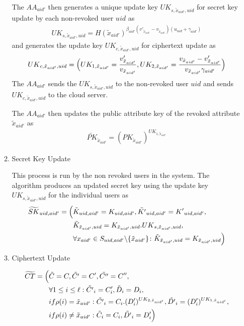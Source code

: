 \begin{enumerate}
\begin{enumerate}
		The $AA_{aid'}$ then generates a unique update key ${UK}_{s,\tilde{x}_{aid'},uid}$ for secret key update by each non-revoked user $uid$ as
		\begin{align*}
			{UK}_{s,\tilde{x}_{aid'},uid} = H(\tilde{x}_{aid'})^{\beta_{aid'}(v'_{\tilde{x}_{aid'}}-v_{\tilde{x}_{aid'}})(u_{uid}+\gamma_{aid'})}
		\end{align*}
		and generates the update key ${UK}_{c,\tilde{x}_{aid'},uid}$ for ciphertext update as
		\begin{align*}
			{UK}_{c,\tilde{x}_{aid'},uid} =\Bigl( UK_{1,\tilde{x}_{aid'}} = \frac{v'_{\tilde{x}_{aid'}}}{v_{\tilde{x}_{aid'}}}, UK_{2,\tilde{x}_{aid'}} = \frac{v_{\tilde{x}_{aid'}} - v'_{\tilde{x}_{aid'}}}{v_{\tilde{x}_{aid'}}\gamma_{aid'}} \Bigl)
		\end{align*}
		The $AA_{aid'}$ sends the ${UK}_{s,\tilde{x}_{aid'},uid}$ to the non-revoked user $uid$ and sends ${UK}_{c,\tilde{x}_{aid'},uid}$ to the cloud server.
		
		The $AA_{aid'}$ then updates the public attribute key of the revoked attribute $\tilde{x}_{aid'}$ as
		\begin{align*}
			\widetilde{PK}_{\tilde{x}_{aid'}} = ({PK}_{\tilde{x}_{aid'}})^{UK_{1,\tilde{x}_{aid'}}}
		\end{align*}
		
		
		\item Secret Key Update
		
		This process is run by the non revoked users in the system. The algorithm produces an updated secret key using the update key ${UK}_{s,\tilde{x}_{aid'},uid}$ for the individual users as
		\begin{align*}
			\widetilde{SK}_{uid,aid'} = \Bigl(&\tilde{K}_{uid,aid'} = {K}_{uid,aid'},\tilde{K'}_{uid,aid'} = {K'}_{uid,aid'},\\
			&\tilde{K}_{\tilde{x}_{aid'},uid} = {K}_{\tilde{x}_{aid'},uid}.{UK}_{s,\tilde{x}_{aid'},uid},\\
			&\forall x_{aid'} \in S_{uid,aid'} \backslash \{ \tilde{x}_{aid'} \} \colon \tilde{K}_{\tilde{x}_{aid'},uid} = {K}_{\tilde{x}_{aid'},uid}  \Bigl) 
		\end{align*}
		
		\item Ciphertext Update
		
		\begin{align*}
			\widetilde{CT} = \Bigl(&\tilde{C} = C, \tilde{C'} = C', \tilde{C''} = C'',\\
			&\forall 1 \leq i \leq \ell: \tilde{C'}_{i} = C'_{i}, \tilde{D}_{i} = D_{i},\\
			&if \rho(i) = \tilde{x}_{aid'} : \tilde{C'}_{i} = C_{i} . (D'_{i})^{UK_{2,\tilde{x}_{aid'}}}, \tilde{D'}_{i} = (D'_{i})^{UK_{1,\tilde{x}_{aid'}}},\\
			&if \rho(i) \neq \tilde{x}_{aid'} : \tilde{C}_{i} = C_{i}, \tilde{D'}_{i} = D'_{i}\Bigl)
		\end{align*}
	\end{enumerate}
	
\end{enumerate}



